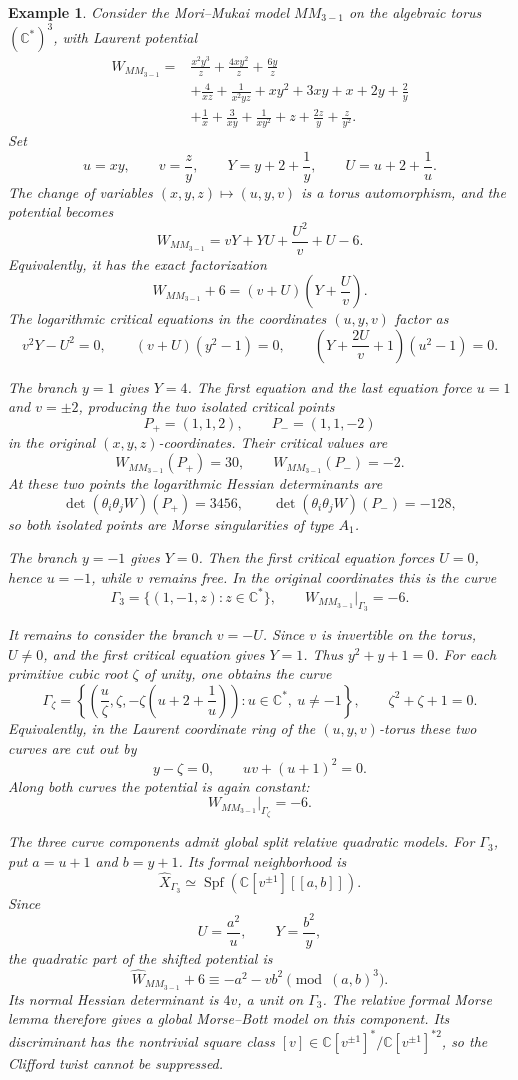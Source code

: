 \documentclass[11pt]{amsart}
\newtheorem{example}{Example}[section]
\begin{document}
\begin{example}
Consider the Mori--Mukai model $MM_{3-1}$ on the algebraic torus
$(\mathbb{C}^*)^3$, with Laurent potential
\begin{align*}
W_{MM_{3-1}}={}&\frac{x^2y^3}{z}+\frac{4xy^2}{z}+\frac{6y}{z} \\
&+\frac{4}{xz}+\frac{1}{x^2yz}+xy^2+3xy+x+2y+\frac{2}{y} \\
&+\frac{1}{x}+\frac{3}{xy}+\frac{1}{xy^2}+z+\frac{2z}{y}
+\frac{z}{y^2}.
\end{align*}
Set
\[
u=xy,
\qquad
v=\frac{z}{y},
\qquad
Y=y+2+\frac{1}{y},
\qquad
U=u+2+\frac{1}{u}.
\]
The change of variables $(x,y,z)\mapsto(u,y,v)$ is a torus automorphism, and
the potential becomes
\[
W_{MM_{3-1}}=vY+YU+\frac{U^2}{v}+U-6.
\]
Equivalently, it has the exact factorization
\[
W_{MM_{3-1}}+6
=
(v+U)\left(Y+\frac{U}{v}\right).
\]
The logarithmic critical equations in the coordinates $(u,y,v)$ factor as
\[
v^2Y-U^2=0,
\qquad
(v+U)(y^2-1)=0,
\qquad
\left(Y+\frac{2U}{v}+1\right)(u^2-1)=0.
\]

The branch $y=1$ gives $Y=4$. The first equation and the last equation force
$u=1$ and $v=\pm2$, producing the two isolated critical points
\[
P_+=(1,1,2),
\qquad
P_-=(1,1,-2)
\]
in the original $(x,y,z)$-coordinates. Their critical values are
\[
W_{MM_{3-1}}(P_+)=30,
\qquad
W_{MM_{3-1}}(P_-)=-2.
\]
At these two points the logarithmic Hessian determinants are
\[
\det(\theta_i\theta_jW)(P_+)=3456,
\qquad
\det(\theta_i\theta_jW)(P_-)=-128,
\]
so both isolated points are Morse singularities of type $A_1$.

The branch $y=-1$ gives $Y=0$. Then the first critical equation forces
$U=0$, hence $u=-1$, while $v$ remains free. In the original coordinates this
is the curve
\[
\Gamma_3=\{(1,-1,z):z\in\mathbb{C}^*\},
\qquad
W_{MM_{3-1}}|_{\Gamma_3}=-6.
\]

It remains to consider the branch $v=-U$. Since $v$ is invertible on the
torus, $U\neq0$, and the first critical equation gives $Y=1$. Thus
$y^2+y+1=0$. For each primitive cubic root $\zeta$ of unity, one obtains the
curve
\[
\Gamma_{\zeta}
=\left\{\left(\frac{u}{\zeta},\zeta,
-\zeta\left(u+2+\frac{1}{u}\right)\right):
u\in\mathbb{C}^*,\ u\neq -1\right\},
\qquad
\zeta^2+\zeta+1=0.
\]
Equivalently, in the Laurent coordinate ring of the $(u,y,v)$-torus these two
curves are cut out by
\[
y-\zeta=0,
\qquad
uv+(u+1)^2=0.
\]
Along both curves the potential is again constant:
\[
W_{MM_{3-1}}|_{\Gamma_\zeta}=-6.
\]

The three curve components admit global split relative quadratic models. For
$\Gamma_3$, put $a=u+1$ and $b=y+1$. Its formal neighborhood is
\[
\widehat X_{\Gamma_3}
\simeq
\operatorname{Spf}\!\left(\mathbb C[v^{\pm1}][[a,b]]\right).
\]
Since
\[
U=\frac{a^2}{u},
\qquad
Y=\frac{b^2}{y},
\]
the quadratic part of the shifted potential is
\[
\widehat W_{MM_{3-1}}+6
\equiv
-a^2-vb^2
\pmod{(a,b)^3}.
\]
Its normal Hessian determinant is $4v$, a unit on $\Gamma_3$. The relative
formal Morse lemma therefore gives a global Morse--Bott model on this
component. Its discriminant has the nontrivial square class
$[v]\in\mathbb C[v^{\pm1}]^*/\mathbb C[v^{\pm1}]^{*2}$, so the Clifford twist
cannot be suppressed.


\end{example}
\end{document}
